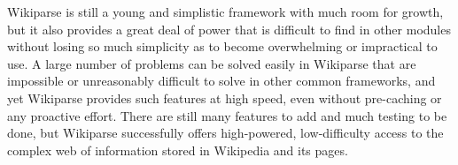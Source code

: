 Wikiparse is still a young and simplistic framework with much room for growth, but it also provides a great deal of power that is difficult to find in other modules without losing so much simplicity as to become overwhelming or impractical to use. A large number of problems can be solved easily in Wikiparse that are impossible or unreasonably difficult to solve in other common frameworks, and yet Wikiparse provides such features at high speed, even without pre-caching or any proactive effort. There are still many features to add and much testing to be done, but Wikiparse successfully offers high-powered, low-difficulty access to the complex web of information stored in Wikipedia and its pages.

